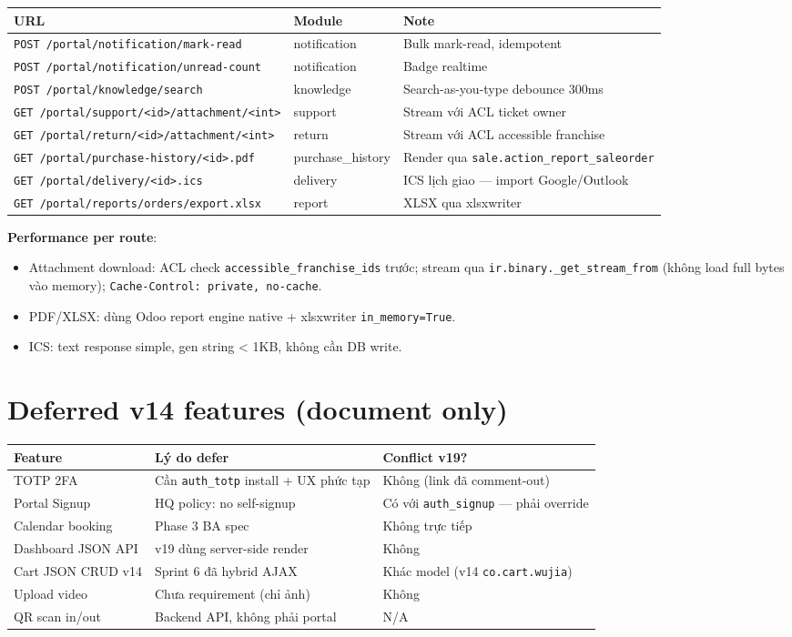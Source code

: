 \begin{tabular}{lll}
\toprule
\textbf{URL} & \textbf{Module} & \textbf{Note} \\
\midrule
\texttt{POST /portal/notification/mark-read} & notification & Bulk mark-read, idempotent \\
\texttt{POST /portal/notification/unread-count} & notification & Badge realtime \\
\texttt{POST /portal/knowledge/search} & knowledge & Search-as-you-type debounce 300ms \\
\texttt{GET /portal/support/<id>/attachment/<int>} & support & Stream với ACL ticket owner \\
\texttt{GET /portal/return/<id>/attachment/<int>} & return & Stream với ACL accessible franchise \\
\texttt{GET /portal/purchase-history/<id>.pdf} & purchase\_history & Render qua \texttt{sale.action\_report\_saleorder} \\
\texttt{GET /portal/delivery/<id>.ics} & delivery & ICS lịch giao --- import Google/Outlook \\
\texttt{GET /portal/reports/orders/export.xlsx} & report & XLSX qua xlsxwriter \\
\bottomrule
\end{tabular}

\textbf{Performance per route}:
\begin{itemize}[leftmargin=*]
    \item Attachment download: ACL check \texttt{accessible\_franchise\_ids} trước; stream qua \texttt{ir.binary.\_get\_stream\_from} (không load full bytes vào memory); \texttt{Cache-Control: private, no-cache}.
    \item PDF/XLSX: dùng Odoo report engine native + xlsxwriter \texttt{in\_memory=True}.
    \item ICS: text response simple, gen string < 1KB, không cần DB write.
\end{itemize}

\section{Deferred v14 features (document only)}

\begin{tabular}{lll}
\toprule
\textbf{Feature} & \textbf{Lý do defer} & \textbf{Conflict v19?} \\
\midrule
TOTP 2FA & Cần \texttt{auth\_totp} install + UX phức tạp & Không (link đã comment-out) \\
Portal Signup & HQ policy: no self-signup & Có với \texttt{auth\_signup} --- phải override \\
Calendar booking & Phase 3 BA spec & Không trực tiếp \\
Dashboard JSON API & v19 dùng server-side render & Không \\
Cart JSON CRUD v14 & Sprint 6 đã hybrid AJAX & Khác model (v14 \texttt{co.cart.wujia}) \\
Upload video & Chưa requirement (chỉ ảnh) & Không \\
QR scan in/out & Backend API, không phải portal & N/A \\
\bottomrule
\end{tabular}

